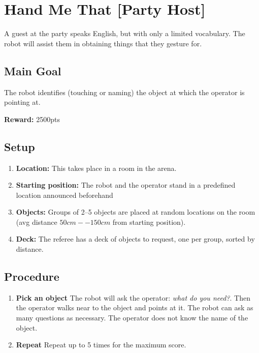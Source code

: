 \section{Hand Me That [Party Host]}
A guest at the party speaks English, but with only a limited vocabulary. The robot will assist them in obtaining things that they gesture for.


\subsection{Main Goal}
The robot identifies (touching or naming) the object at which the operator is pointing at.

\noindent\textbf{Reward:} 2500pts\\


%
%
\subsection{Setup}
\begin{enumerate}
\item \textbf{Location:} This takes place in a room in the arena.
\item \textbf{Starting position:} The robot and the operator stand in a predefined location announced beforehand %
\item \textbf{Objects:} Groups of 2--5 objects are placed at random locations on the room (avg distance $50cm -- 150cm$ from starting position).
\item \textbf{Deck:} The referee has a deck of objects to request, one per group, sorted by distance.

\end{enumerate}


%
%
\subsection{Procedure}
\begin{enumerate}
	\item \textbf{Pick an object} The robot will ask the operator: \emph{what do you need?}. %
Then the operator walks near to the object and points at it.
The robot can ask as many questions as necessary.
The operator does not know the name of the object.
  \item \textbf{Repeat} Repeat up to 5 times for the maximum score.


\end{enumerate}


